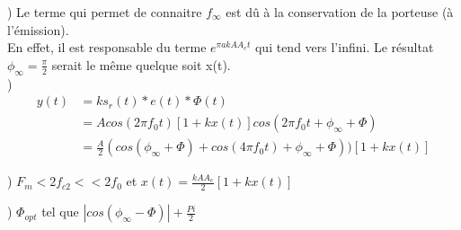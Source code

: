 \documentclass{../../td}
\begin{document}
) Le terme qui permet de connaitre $f_{\infty}$ est dû à la conservation de la porteuse (à l'émission).\\
En effet, il est responsable du terme $e^{\pi a k A A_e t}$ qui tend vers l'infini.
Le résultat $\phi_{\infty} = \frac{\pi}{2}$ serait le même quelque soit x(t).\\

) 
\begin{align*}
y(t) &= ks_r(t)*e(t)*\Phi(t)\\
&= Acos(2\pi f_0t)[1+kx(t)]cos(2\pi f_0t + \phi_{\infty} + \Phi)\\
&= \frac{A}{2}(cos(\phi_{\infty}+\Phi)+cos(4\pi f_0t) + \phi_{\infty}+\Phi))[1+kx(t)]
\end{align*}
\bigbreak
\bigbreak

) $F_m < 2 f_{c2} << 2f_0$ et $x(t) = \frac{kAA_e}{2}[1+kx(t)]$

) $\Phi_{opt}$ tel que $|cos(\phi_{\infty} - \Phi)| + \frac{Pi}{2}$
\end{document}
